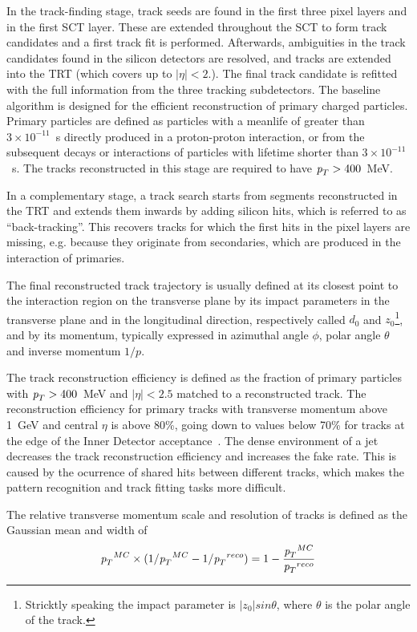 In the track-finding stage, track seeds are found in the first three pixel layers and in the first SCT layer. These are extended throughout the SCT to form track candidates and a first track fit is performed. Afterwards, ambiguities in the track candidates found in the silicon detectors are resolved, and tracks are extended into the TRT (which covers up to $|\eta|<2.$). The final track candidate is refitted with the full information from the three tracking subdetectors. The baseline algorithm is designed for the efficient reconstruction of primary charged particles. Primary particles are defined as particles with a meanlife of greater than $3 \times 10^{-11}$~s directly produced in a proton-proton interaction, or from the subsequent decays or interactions of particles with lifetime shorter than $3 \times 10^{-11}$~s. The tracks reconstructed in this stage are required to have ${\emph{p}_{T}}> 400$~MeV.

In a complementary stage, a track search starts from segments reconstructed in the TRT and extends them inwards by adding silicon hits, which is referred to as ``back-tracking''. This recovers tracks for which the first hits in the pixel layers are missing, e.g. because they originate from secondaries, which are produced in the interaction of primaries.

The final reconstructed track trajectory is usually defined at its closest point to the interaction region on the transverse plane by its impact parameters in the transverse plane and in the longitudinal direction, respectively called $d_0$ and $z_0$\footnote{Stricktly speaking the impact parameter is $|z_0|sin\theta$, where $\theta$ is the polar angle of the track.}, and by its momentum, typically expressed in azimuthal angle $\phi$, polar angle $\theta$ and inverse momentum $1/p$. 

 The track reconstruction efficiency is defined as the fraction of primary particles with ${\emph{p}_{T}}> 400$~MeV and $|\eta|<2.5$ matched to a reconstructed track. The reconstruction efficiency for primary tracks with transverse momentum above 1~GeV and central $\eta$ is above 80\%, going down to values below 70\% for tracks at the edge of the Inner Detector acceptance~\cite{chargemultiplicity}. %
The dense environment of a jet decreases the track reconstruction efficiency and increases the fake rate. This is caused by the ocurrence of shared hits between different tracks, which makes the pattern recognition and track fitting tasks more difficult.

The relative transverse momentum scale and resolution of tracks is defined as the Gaussian mean and width of
%
\begin{equation}
{\emph{p}_{T}}^{MC} \times (1/{\emph{p}_{T}}^{MC}  - 1/{\emph{p}_{T}}^{reco}) = 1 - \frac{{\emph{p}_{T}}^{MC}}{{\emph{p}_{T}}^{reco}}
\end{equation}

